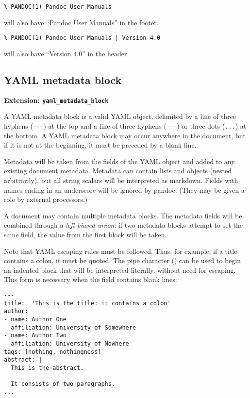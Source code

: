 \documentclass[]{article}
\begin{document}
\begin{verbatim}
% PANDOC(1) Pandoc User Manuals
\end{verbatim}

will also have ``Pandoc User Manuals'' in the footer.

\begin{verbatim}
% PANDOC(1) Pandoc User Manuals | Version 4.0
\end{verbatim}

will also have ``Version 4.0'' in the header.

\subsection{YAML metadata block}\label{yaml-metadata-block}

\textbf{Extension: \texttt{yaml\_metadata\_block}}

A YAML metadata block is a valid YAML object, delimited by a line of
three hyphens (\texttt{-{}-{}-}) at the top and a line of three hyphens
(\texttt{-{}-{}-}) or three dots (\texttt{...}) at the bottom. A YAML
metadata block may occur anywhere in the document, but if it is not at
the beginning, it must be preceded by a blank line.

Metadata will be taken from the fields of the YAML object and added to
any existing document metadata. Metadata can contain lists and objects
(nested arbitrarily), but all string scalars will be interpreted as
markdown. Fields with names ending in an underscore will be ignored by
pandoc. (They may be given a role by external processors.)

A document may contain multiple metadata blocks. The metadata fields
will be combined through a \emph{left-biased union}: if two metadata
blocks attempt to set the same field, the value from the first block
will be taken.

Note that YAML escaping rules must be followed. Thus, for example, if a
title contains a colon, it must be quoted. The pipe character
(\texttt{\textbar{}}) can be used to begin an indented block that will
be interpreted literally, without need for escaping. This form is
necessary when the field contains blank lines:

\begin{verbatim}
---
title:  'This is the title: it contains a colon'
author:
- name: Author One
  affiliation: University of Somewhere
- name: Author Two
  affiliation: University of Nowhere
tags: [nothing, nothingness]
abstract: |
  This is the abstract.

  It consists of two paragraphs.
...
\end{verbatim}
\end{document}
